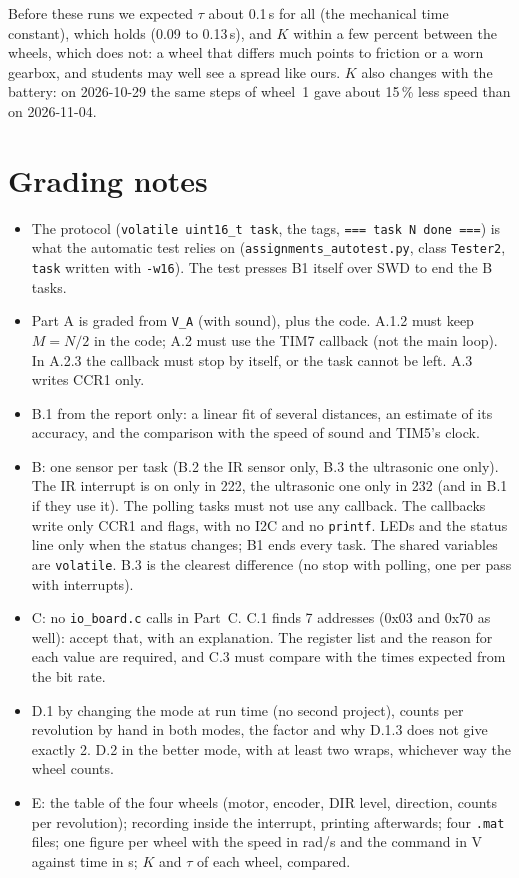 \documentclass[11pt,a4paper]{article}
\newcommand{\lv}[1]{\texttt{#1}}                 %
\begin{document}
Before these runs we expected $\tau$ about 0.1\,s for all (the mechanical time constant), which holds
(0.09 to 0.13\,s), and $K$ within a few percent between the wheels, which does not: a wheel that differs much
points to friction or a worn gearbox, and students may well see a spread like ours. $K$ also changes with the battery: on
2026-10-29 the same steps of wheel~1 gave about 15\,\% less speed than on 2026-11-04.

\section{Grading notes}
\begin{itemize}
  \item The protocol (\texttt{volatile uint16\_t task}, the tags, \texttt{=== task N done ===}) is what the automatic
        test relies on (\texttt{assignments\_autotest.py}, class \texttt{Tester2}, \lv{task} written with
        \texttt{-w16}). The test presses B1 itself over SWD to end the B tasks.
  \item Part A is graded from \texttt{V\_A} (with sound), plus the code. A.1.2 must keep $M = N/2$ in the code; A.2
        must use the TIM7 callback (not the main loop). In A.2.3 the callback must stop by itself, or the task
        cannot be left. A.3 writes CCR1 only.
  \item B.1 from the report only: a linear fit of several distances, an estimate of its accuracy, and the comparison
        with the speed of sound and TIM5's clock.
  \item B: one sensor per task (B.2 the IR sensor only, B.3 the ultrasonic one only). The IR interrupt is on
        only in 222, the ultrasonic one only in 232 (and in B.1 if they use it). The polling
        tasks must not use any callback. The callbacks write only CCR1 and flags, with no I2C and no \texttt{printf}.
        LEDs and the status line only when the status changes; B1 ends every task. The shared variables are
        \texttt{volatile}. B.3 is the clearest difference (no stop with polling, one per pass with interrupts).
  \item C: no \texttt{io\_board.c} calls in Part~C. C.1 finds 7 addresses (0x03 and 0x70 as well): accept that, with
        an explanation. The register list and the reason for each value are required, and C.3 must compare with the
        times expected from the bit rate.
  \item D.1 by changing the mode at run time (no second project), counts per revolution by hand in both modes, the
        factor and why D.1.3 does not give exactly 2. D.2 in the better mode, with at least two wraps, whichever way
        the wheel counts.
  \item E: the table of the four wheels (motor, encoder, DIR level, direction, counts per revolution); recording
        inside the interrupt, printing afterwards; four \texttt{.mat} files; one figure per wheel with the speed in
        rad/s and the command in V against time in s; $K$ and $\tau$ of each wheel, compared.
\end{itemize}
\end{document}
